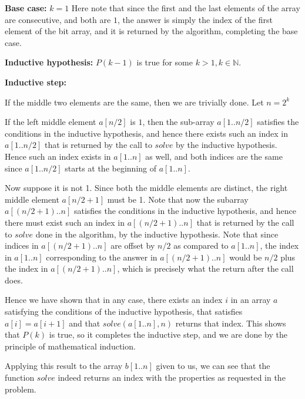 \documentclass[answers]{exam}
\begin{document}
\begin{questions}
\begin{solution}
\textbf{Base case:} $k = 1$
Here note that since the first and the last elements of the array are consecutive, and both are $1$, the answer is simply the index of the first element of the bit array, and it is returned by the algorithm, completing the base case.

\textbf{Inductive hypothesis:} $P(k - 1)$ is true for some $k > 1, k \in \mathbb{N}$.

\textbf{Inductive step:}

If the middle two elements are the same, then we are trivially done. Let $n = 2^k$

If the left middle element $a[n / 2]$ is $1$, then the sub-array $a[1..n/2]$ satisfies the conditions in the inductive hypothesis, and hence there exists such an index in $a[1..n/2]$ that is returned
        by the call to $solve$ by the inductive hypothesis. Hence such an index exists in $a[1..n]$ as well, and both indices are the same since $a[1..n/2]$ starts at the beginning of $a[1..n]$.

        Now suppose it is not 1. Since both the middle elements are distinct, the right middle element $a[n / 2 + 1]$ must be 1. Note that now the subarray $a[(n/2+1)..n]$ satisfies the conditions in
        the inductive hypothesis, and hence there must exist such an index in $a[(n/2+1)..n]$ that is returned by the call to $solve$ done in the algorithm, by the inductive hypothesis. Note that
        since indices in $a[(n/2+1)..n]$ are offset by $n/2$ as compared to $a[1..n]$, the index in $a[1..n]$ corresponding to the answer in $a[(n/2+1)..n]$ would be $n/2$ plus the index in
        $a[(n/2+1)..n]$, which is precisely what the return after the call does.

Hence we have shown that in any case, there exists an index $i$ in an array $a$ satisfying the conditions of the inductive hypothesis, that satisfies $a[i] = a[i + 1]$ and that $solve(a[1..n],
        n)$ returns that index. This shows that $P(k)$ is true, so it completes the inductive step, and we are done by the principle of mathematical induction.

Applying this result to the array $b[1..n]$ given to us, we can see that the function $solve$ indeed returns an index with the properties as requested in the problem.
    \end{solution}

\end{questions}
\end{document}
